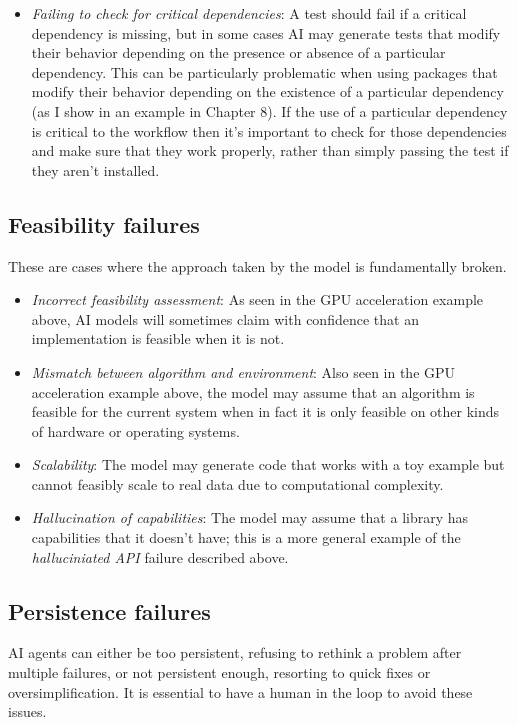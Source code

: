 \begin{itemize}
\item \textit{Failing to check for critical dependencies}: A test should fail if a critical dependency is missing, but in some cases AI may generate tests that modify their behavior depending on the presence or absence of a particular dependency. This can be particularly problematic when using packages that modify their behavior depending on the existence of a particular dependency (as I show in an example in Chapter 8).  If the use of a particular dependency is critical to the workflow then it's important to check for those dependencies and make sure that they work properly, rather than simply passing the test if they aren't installed.
\end{itemize}

\subsection{Feasibility failures}

These are cases where the approach taken by the model is fundamentally broken.

\begin{itemize}
\item \textit{Incorrect feasibility assessment}: As seen in the GPU acceleration example above, AI models will sometimes claim with confidence that an implementation is feasible when it is not.
\item \textit{Mismatch between algorithm and environment}: Also seen in the GPU acceleration example above, the model may assume that an algorithm is feasible for the current system when in fact it is only feasible on other kinds of hardware or operating systems.
\item \textit{Scalability}: The model may generate code that works with a toy example but cannot feasibly scale to real data due to computational complexity.
\item \textit{Hallucination of capabilities}: The model may assume that a library has capabilities that it doesn't have; this is a more general example of the \textit{halluciniated API} failure described above.
\end{itemize}

\subsection{Persistence failures}

AI agents can either be too persistent, refusing to rethink a problem after multiple failures, or not persistent enough, resorting to quick fixes or oversimplification.  It is essential to have a human in the loop to avoid these issues.

